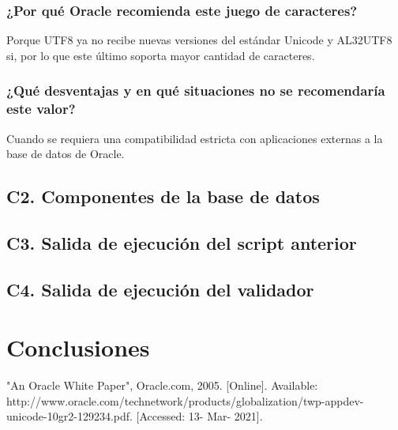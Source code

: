 \documentclass[journal]{IEEEtran}
\begin{document}
\subsubsection{¿Por qué Oracle recomienda este juego de caracteres?}
Porque UTF8 ya no recibe nuevas versiones del estándar Unicode y AL32UTF8 si, por lo que este último
soporta mayor cantidad de caracteres.
\subsubsection{¿Qué desventajas y en qué situaciones no se recomendaría este valor?}
Cuando se requiera una compatibilidad estricta con aplicaciones externas a la base de datos de Oracle.
\subsection{C2. Componentes de la base de datos}

\subsection{C3. Salida de ejecución del script anterior}
\subsection{C4. Salida de ejecución del validador}

\section{Conclusiones}

\ifCLASSOPTIONcaptionsoff
  \newpage

\fi

\begin{thebibliography}{2}
  "An Oracle White Paper", 
  Oracle.com, 2005. [Online]. 
  Available: http://www.oracle.com/technetwork/products/globalization/twp-appdev-unicode-10gr2-129234.pdf. 
  [Accessed: 13- Mar- 2021].
\end{thebibliography}
\end{document}
